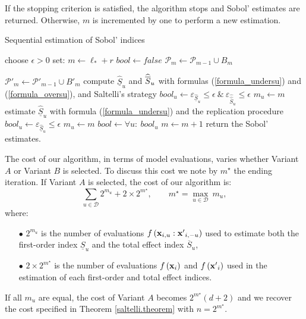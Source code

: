 If the stopping criterion is satisfied, the algorithm stops and Sobol' estimates are returned. Otherwise, $m$ is incremented by one to perform a new estimation. 
\begin{algorithm}[!ht]
\caption{Sequential estimation of Sobol' indices}
\begin{algorithmic}[1]
\vspace*{0.2cm}
\State choose $\epsilon >0$
\State set: $m \leftarrow \ell_*+r$
\State $bool \leftarrow false$
\State $\mathcal{P}_m \leftarrow \mathcal{P}_{m-1} \cup B_m$

\hspace*{-0.3cm} $\mathcal{P}'_m \leftarrow \mathcal{P}'_{m-1} \cup {B'}_m$
\State compute $\widehat{\underline{S}}_u$ and $\widehat{\ov{$S$}}_u$ with formulas (\ref{formula_undersu}) and (\ref{formula_oversu}), and Saltelli's strategy
\State $bool_u \leftarrow \varepsilon_{\widehat{\underline{S}}_u} \leq \epsilon \ \& \ \varepsilon_{\widehat{\widehat{\overline{S}}}_u} \leq \epsilon$
\State $m_u \leftarrow m$
\EndIf
\EndIf
{}
\State estimate $\widehat{\underline{S}}_u$ with formula (\ref{formula_undersu}) and the replication procedure
\State $bool_u \leftarrow \varepsilon_{\widehat{\underline{S}}_u} \leq \epsilon$
\State $m_u \leftarrow m$
\EndIf
\EndIf
\EndFor
\State $bool \leftarrow \forall u: \ bool_u$
\State $m \leftarrow m + 1$
\EndWhile
\State return the Sobol' estimates.
\end{algorithmic}
\label{recursive.algorithm}
\end{algorithm}
\bigskip

The cost of our algorithm, in terms of model evaluations, varies whether Variant $A$ or Variant $B$ is selected. To discuss this cost we note by $m^\star$ the ending iteration. If Variant $A$ is selected, the cost of our algorithm is:
\[\sum \limits_{u \in \mathcal{D}} 2^{m_u} + 2 \times 2^{m^{\star}}, \qquad m^\star= \max \limits_{u \in \mathcal{D}} \ m_u,\]
where: 
\begin{itemize}
\item[$\bullet$] $2^{m_u}$ is the number of evaluations $f\left(\boldsymbol{\mathbf{x}}_{i,u}:{\boldsymbol{\mathbf{x}}'}_{i,-u}\right)$ used to estimate both the first-order index $\underline{S}_u$ and the total effect index $\overline{S}_u$,
\item[$\bullet$] $2 \times 2^{m^{\star}}$ is the number of evaluations $f\left(\boldsymbol{\mathbf{x}}_{i}\right)$ and $f\left({\boldsymbol{\mathbf{x}}'}_{i}\right)$ used in the estimation of each first-order and total effect indices.
\end{itemize}
If all $m_u$ are equal, the cost of Variant $A$ becomes $2^{m^\star}(d+2)$ and we recover the cost specified in Theorem \ref{saltelli.theorem} with $n=2^{m^\star}$.

